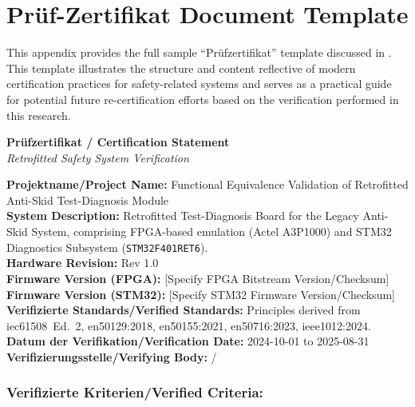 \chapter{Prüf-Zertifikat Document Template}
\label{app:pruefzertifikat}

This appendix provides the full sample \enquote{Prüfzertifikat} template discussed in . This template illustrates the structure and content reflective of modern certification practices for safety-related systems and serves as a practical guide for potential future re-certification efforts based on the verification performed in this research.

\bigskip
\hrulefill
\bigskip

\begin{center}
	\textbf{\Large Prüfzertifikat / Certification Statement} \\[1em]
	\textit{\large Retrofitted Safety System Verification}
\end{center}

\bigskip

\noindent\textbf{Projektname/Project Name:} Functional Equivalence Validation of Retrofitted Anti-Skid Test-Diagnosis Module \\
\textbf{System Description:} Retrofitted Test-Diagnosis Board for the Legacy Anti-Skid System, comprising FPGA-based emulation (Actel A3P1000) and STM32 Diagnostics Subsystem (\texttt{STM32F401RET6}). \\
\textbf{Hardware Revision:} Rev 1.0 \\
\textbf{Firmware Version (FPGA):} [Specify FPGA Bitstream Version/Checksum] \\
\textbf{Firmware Version (STM32):} [Specify STM32 Firmware Version/Checksum] \\
\textbf{Verifizierte Standards/Verified Standards:} Principles derived from \gls{iec61508}~Ed.~2, \gls{en50129}:2018, \gls{en50155}:2021, \gls{en50716}:2023, \gls{ieee1012}:2024. \\
\textbf{Datum der Verifikation/Verification Date:} {2024-10-01} to {2025-08-31} \\
\textbf{Verifizierungsstelle/Verifying Body:} \projAuthor / \projInstitution

\subsection*{Verifizierte Kriterien/Verified Criteria:}

